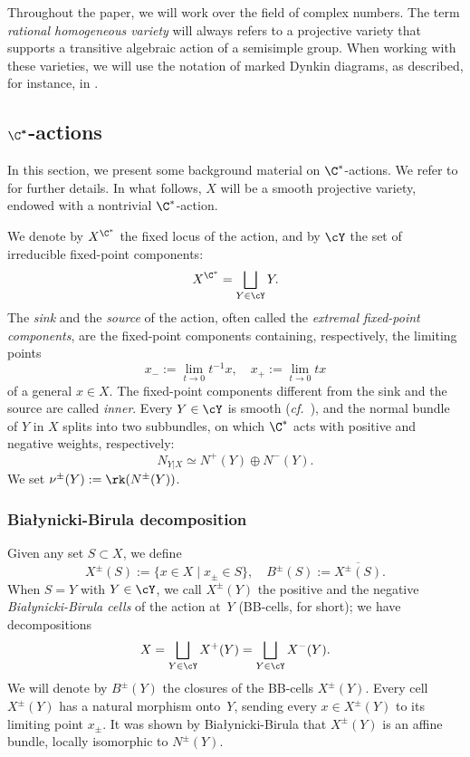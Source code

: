 \documentclass[11pt]{amsart}
\numberwithin{equation}{section}
\theoremstyle{definition}
\theoremstyle{remark}
\begin{document}
Throughout the paper, we will work over the field of complex numbers. The term {\em rational homogeneous variety} will always refers to a projective variety that supports a transitive algebraic action of a semisimple group. When working with these varieties, we will use the notation of marked Dynkin diagrams, as described, for instance, in \cite[Section~3.1]{WORS5}.

\subsection{$\boldsymbol{\C^*}$-actions}\label{sec:c*}

In this section, we  present some background material on $\C^*$-actions. We refer to \cite{BB,CARRELL,WORS1} for further details. In what follows, $X$ will be a smooth projective variety, endowed with a nontrivial $\C^*$-action.

We denote by $X^{\C^*}$  the fixed locus of the action, and by $\cY$ the set of irreducible fixed-point components: 
$$X^{\C^*}=\bigsqcup_{Y\in \cY}Y.$$ 
 The {\em sink} and the {\em source} of the action, often called the {\em extremal fixed-point components}, are the fixed-point components containing, respectively, the limiting points 
$$
x_-:=\lim_{t\to 0}t^{-1}x, \quad x_+:=\lim_{t\to 0}tx
$$
of a general $x \in X$.  The fixed-point components different from the sink and the source are called {\em inner}.  Every $Y\in\cY$ is smooth (\textit{cf.}~\cite{IVERSEN}), and the normal bundle of $Y$ in $X$ splits into two subbundles, on which $\C^*$ acts with positive and negative weights, respectively:
\begin{equation}
N_{Y|X}\simeq N^+(Y)\oplus N^-(Y).
\label{eq:normal+-}
\end{equation}
We set $\nu^{\pm}(Y):=\rk (N^{\pm}(Y))$.

\subsubsection{Bia{\l}ynicki-Birula decomposition}
Given any set $S \subset X$, we define
\begin{equation}\label{eq:BBcells}
X^\pm(S):=\{x\in X\mid x_\pm\in S\}, \quad
B^\pm(S):=\overline{X^\pm(S)}.
\end{equation}
When $S=Y$ with $Y\in \cY$, we call $X^\pm(Y)$ the positive and the negative {\it Bia{\l}ynicki-Birula cells} of the action at~$Y$  (BB-cells, for short);  we have decompositions 
$$X=\bigsqcup_{Y\in\cY}X^+(Y)=\bigsqcup_{Y\in\cY}X^-(Y).$$  
We will denote by $B^\pm(Y)$ the closures of the BB-cells $X^\pm(Y)$. Every cell $X^\pm(Y)$ has a natural morphism onto~$Y$, sending every $x\in X^\pm(Y)$ to its limiting point $x_\pm$. It was shown by Bia{\l}ynicki-Birula that $X^\pm(Y)$ is an affine bundle, locally isomorphic to $N^\pm(Y)$.
\end{document}
